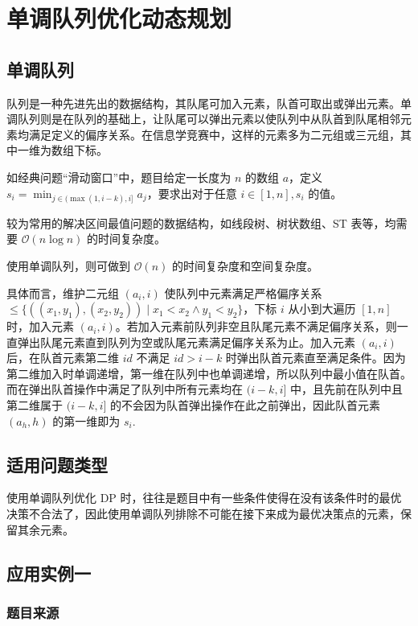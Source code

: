 
\chapter{单调队列优化动态规划}

\section{单调队列}

队列是一种先进先出的数据结构，其队尾可加入元素，队首可取出或弹出元素。单调队列则是在队列的基础上，让队尾可以弹出元素以使队列中从队首到队尾相邻元素均满足定义的偏序关系。在信息学竞赛中，这样的元素多为二元组或三元组，其中一维为数组下标。

如经典问题``滑动窗口''中，题目给定一长度为 \(n\) 的数组 \(a\)，定义
\(s_i=\min_{j\in(\max(1,i-k),i]} a_j\)，要求出对于任意 \(i\in[1,n],s_i\)
的值。

较为常用的解决区间最值问题的数据结构，如线段树、树状数组、ST
表等，均需要 \(\mathcal{O}(n\log n)\) 的时间复杂度。

使用单调队列，则可做到 \(\mathcal{O}(n)\) 的时间复杂度和空间复杂度。

具体而言，维护二元组 \((a_i,i)\) 使队列中元素满足严格偏序关系
\(\le\{((x_1,y_1),(x_2,y_2))\mid x_1 < x_2\land y_1 < y_2\}\)，下标
\(i\) 从小到大遍历 \([1,n]\) 时，加入元素
\((a_i,i)\)。若加入元素前队列非空且队尾元素不满足偏序关系，则一直弹出队尾元素直到队列为空或队尾元素满足偏序关系为止。加入元素
\((a_i,i)\) 后，在队首元素第二维 \(id\) 不满足 \(id > i-k\)
时弹出队首元素直至满足条件。因为第二维加入时单调递增，第一维在队列中也单调递增，所以队列中最小值在队首。而在弹出队首操作中满足了队列中所有元素均在
\((i-k,i]\) 中，且先前在队列中且第二维属于 \((i-k,i]\)
的不会因为队首弹出操作在此之前弹出，因此队首元素 \((a_{h},h)\)
的第一维即为 \(s_i\).

\section{适用问题类型}

使用单调队列优化 DP
时，往往是题目中有一些条件使得在没有该条件时的最优决策不合法了，因此使用单调队列排除不可能在接下来成为最优决策点的元素，保留其余元素。

\section{应用实例一}

\subsection{题目来源}

